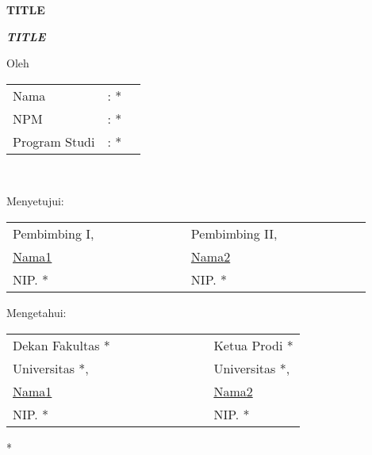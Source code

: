 \setcounter{page}{2}
\begin{center}
{\large\textbf{TITLE}}\\[1cm]
\end{center}

\begin{center}
{\large\textbf{\textit{TITLE}}}\\[1cm]
\end{center}  
\begin{center}
{\large Oleh}
\end{center}

\begin{center}
\normalsize
\noindent
\begin{tabular}{l l l}
    Nama \verb"  " &: * \\
	NPM &: * \\
	Program Studi	&: * \\ 
\end{tabular} \\
\end{center}
\begin{center}
\vspace{0.5cm}
Menyetujui:\\%

\vspace{1cm}

\begin{tabular}{l l }
Pembimbing I,\verb"             " & Pembimbing II, \verb"            "\\[2.25cm]
\underline{Nama1} & \underline{Nama2}\\
NIP. * & NIP. *
\end{tabular}
\end{center}

\begin{center}
\vspace{0.5cm}
Mengetahui:\\%

\vspace{1cm}

\begin{tabular}{l l }
Dekan Fakultas *\verb"             " & \verb" "Ketua Prodi *\\
Universitas *, & \verb" "Universitas *,\\[2.25cm]
\underline{Nama1} & \verb" "\underline{Nama2}\\
NIP. * & \verb" "NIP. *
\end{tabular}
\end{center}
\vspace{0.3cm}
\begin{center}
*
\end{center}
\thispagestyle{empty}
